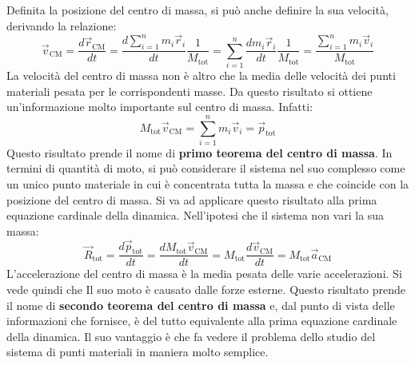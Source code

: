 \documentclass[10pt,a4paper]{book}
\begin{document}
\begin{figure}[htpb]
\end{figure}
\FloatBarrier
Definita la posizione del centro di massa, si può anche definire la sua velocità, derivando la relazione:
\[
	\vec{v}_\text{CM}=\frac{d\vec{r}_\text{CM}}{dt}=\frac{d\sum_{i=1}^nm_i\vec{r}_i}{dt} \frac{1}{M_\text{tot}}=\sum_{i=1}^n\frac{dm_i\vec{r}_i}{dt} \frac{1}{M_\text{tot}}=\frac{\sum_{i=1}^nm_i\vec{v}_i}{M_\text{tot}}
\]
La velocità del centro di massa non è altro che la media delle velocità dei punti materiali pesata per le corrispondenti masse. Da questo risultato si ottiene un'informazione molto importante sul centro di massa. Infatti:
\[
	\boxed{M_\text{tot}\vec{v}_\text{CM}=\sum_{i=1}^nm_i \vec{v}_i=\vec{p}_\text{tot}}
\]
Questo risultato prende il nome di \textbf{primo teorema del centro di massa}. In termini di quantità di moto, si può considerare il sistema nel suo complesso come un unico punto materiale in cui è concentrata tutta la massa e che coincide con la posizione del centro di massa. Si va ad applicare questo risultato alla prima equazione cardinale della dinamica. Nell'ipotesi che il sistema non vari la sua massa:
\[
	\boxed{\vec{R}_\text{tot}=\frac{d\vec{p}_\text{tot}}{dt}=\frac{dM_\text{tot}\vec{v}_\text{CM}}{dt}=M_\text{tot}\frac{d\vec{v}_\text{CM}}{dt}=M_\text{tot}\vec{a}_\text{CM}}
\]
L'accelerazione del centro di massa è la media pesata delle varie accelerazioni. Si vede quindi che Il suo moto è causato dalle forze esterne.  Questo risultato prende il nome di \textbf{secondo teorema del centro di massa} e, dal punto di vista delle informazioni che fornisce, è del tutto equivalente alla prima equazione cardinale della dinamica. Il suo vantaggio è che fa vedere il problema dello studio del sistema di punti materiali in maniera molto semplice.
\end{document}

